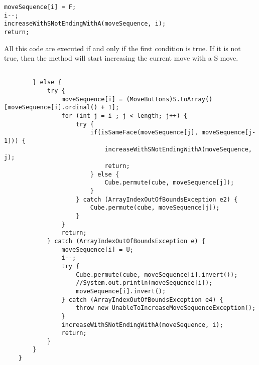 \begin{verbatim}
moveSequence[i] = F;
i--;
increaseWithSNotEndingWithA(moveSequence, i);
return;
\end{verbatim}

All this code are executed if and only if the first condition is true.
If it is not true, then the method will start increasing the current move with a S move.


\begin{verbatim}

		} else {
			try {
				moveSequence[i] = (MoveButtons)S.toArray()[moveSequence[i].ordinal() + 1];
				for (int j = i ; j < length; j++) {
					try {
						if(isSameFace(moveSequence[j], moveSequence[j-1])) {
							increaseWithSNotEndingWithA(moveSequence, j);
							return;
						} else {
							Cube.permute(cube, moveSequence[j]);
						}
					} catch (ArrayIndexOutOfBoundsException e2) {
						Cube.permute(cube, moveSequence[j]);
					}
				}
				return; 
			} catch (ArrayIndexOutOfBoundsException e) {
				moveSequence[i] = U;
				i--;
				try {
					Cube.permute(cube, moveSequence[i].invert());
					//System.out.println(moveSequence[i]);
					moveSequence[i].invert();
				} catch (ArrayIndexOutOfBoundsException e4) {
					throw new UnableToIncreaseMoveSequenceException();
				}
				increaseWithSNotEndingWithA(moveSequence, i);
				return;
			}
		}
	}
	
\end{verbatim}